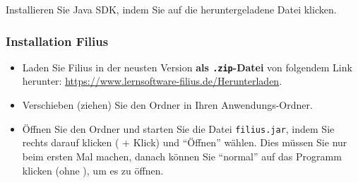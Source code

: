 Installieren Sie Java SDK, indem Sie auf die heruntergeladene Datei klicken.

\subsubsection{Installation Filius}

\begin{itemize}
\item Laden Sie Filius in der neusten Version \textbf{als \texttt{.zip}-Datei} von folgendem Link herunter: \url{https://www.lernsoftware-filius.de/Herunterladen}. 
\item Verschieben (ziehen) Sie den Ordner in Ihren Anwendungs-Ordner.
\item Öffnen Sie den Ordner und starten Sie die Datei \texttt{filius.jar}, indem Sie rechts darauf klicken (\keys{\Alt} + Klick) und ``Öffnen'' wählen. Dies müssen Sie nur beim ersten Mal machen, danach können Sie ``normal'' auf das Programm klicken (ohne \keys{\Alt}), um es zu öffnen.
\end{itemize}


\newpage
\printglossary